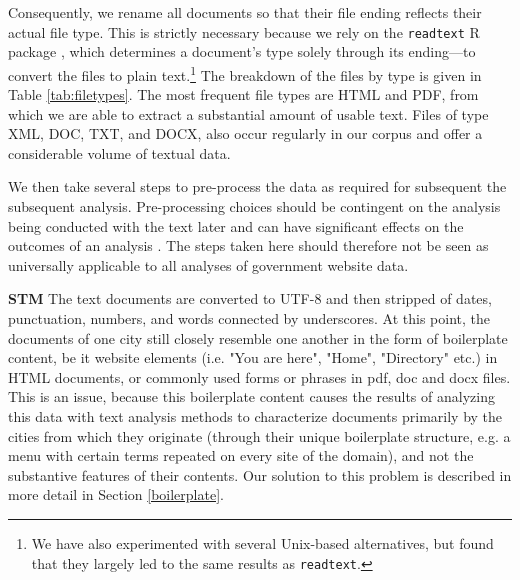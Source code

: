 \documentclass[11pt]{article}
\begin{document}
Consequently, we rename all documents so that their file ending reflects their actual file type. This is strictly necessary because we rely on the \texttt{readtext} R package \citep{readtext}, which determines a document's type solely through its ending---to convert the files to plain text.\footnote{We have also experimented with several Unix-based alternatives, but found that they largely led to the same results as \texttt{readtext}.} The breakdown of the files by type is given in Table \ref{tab:filetypes}. The most frequent file types are HTML and PDF, from which we are able to extract a substantial amount of usable text. Files of type XML, DOC, TXT, and DOCX, also occur regularly in our corpus and offer a considerable volume of textual data.






We then take several steps to pre-process the data as required for subsequent the subsequent analysis. Pre-processing choices should be contingent on the analysis being conducted with the text later and can have significant effects on the outcomes of an analysis \citep{denny2018text}. The steps taken here should therefore not be seen as universally applicable to all analyses of government website data. 

{\bf STM}
The text documents are converted to UTF-8 and then stripped of dates, punctuation, numbers, and words connected by underscores. At this point, the documents of one city still closely resemble one another in the form of boilerplate content, be it website elements (i.e. "You are here", "Home", "Directory" etc.) in HTML documents, or commonly used forms or phrases in pdf, doc and docx files. This is an issue, because this boilerplate content causes the results of analyzing this data with text analysis methods to characterize documents primarily by the cities from which they originate (through their unique boilerplate structure, e.g. a menu with certain terms repeated on every site of the domain), and not the substantive features of their contents. Our solution to this problem is described in more detail in Section \ref{boilerplate}.
\end{document}
